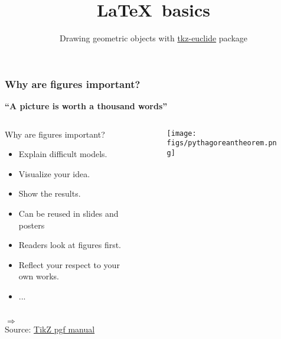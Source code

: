 \documentclass[hyperref={pdfpagelayout=SinglePage}]{beamer}
\title[Discriminative Dictionary Learning]{\LaTeX ~basics}
\subtitle{}
\author[Tiep Huu Vu]{Drawing geometric objects with \href{http://www.altermundus.fr/downloads/documents/Sangaku.pdf}{tkz-euclide} package}
\institute {\\
\par Tiep Vu Huu\\ \vspace{4mm}}
\def\tcb{\color{blue}}
\begin{document}

{
%
\begin{frame}[plain]
\end{frame}
}
\begin{frame}[fragile]
\frametitle{Why are figures important?}
\begin{center}
    {\textbf{\tcb``A picture is worth a thousand words''}}
\end{center}

\begin{columns}
    \begin{column}{0.6\textwidth}

        Why are figures important?
        \begin{itemize}
            \item Explain difficult models.
            \item Visualize your idea.
            \item Show the results.
            \item Can be reused in slides and posters
            \item Readers look at figures first. 
            \item Reflect your respect to your own works.
            \item ...
        \end{itemize}

    \end{column}

    \begin{column}{0.4\textwidth}
    \begin{figure}
        \texttt{[image: figs/pythagoreantheorem.png]}
    \end{figure}
    \end{column}
\end{columns}

$\Rightarrow$ \tcb{\bf Treat graphics as first-class citizens of your papers} 
\\
Source: \href{https://www.bu.edu/math/files/2013/08/tikzpgfmanual.pdf}{\tcb TikZ pgf manual}

\end{frame}
\end{document}
